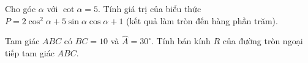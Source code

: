 	\begin{ex}%
		Cho góc $\alpha$ với $\cot \alpha=5$. Tính giá trị của biểu thức $P=2\cos^2 \alpha+5\sin \alpha \cos \alpha+1$ (kết quả làm tròn đến hàng phần trăm).
	\end{ex}
	\begin{ex}%
		Tam giác $ABC$ có $BC=10$ và $\widehat{A}=30^{\circ}$. Tính bán kính $R$ của đường tròn ngoại tiếp tam giác $ABC$.
	\end{ex}
	
